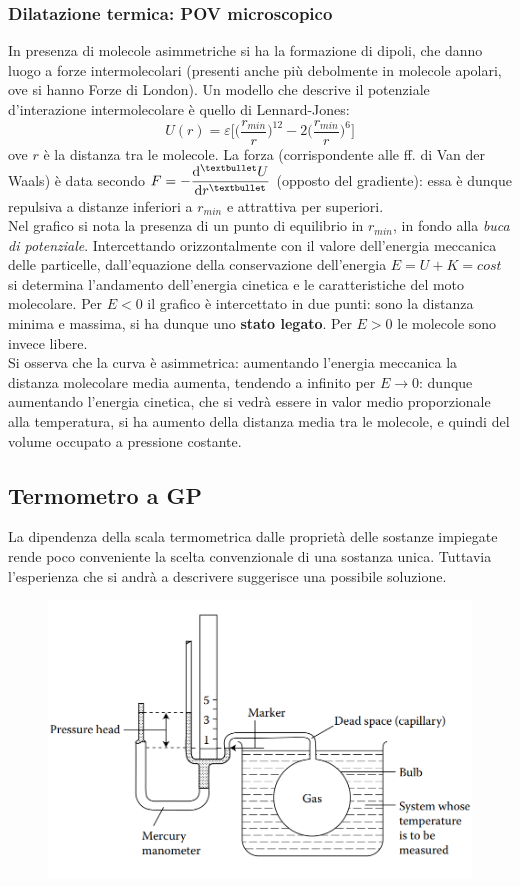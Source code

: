 \documentclass[10pt, oneside]{book}
\begin{document}
\subsubsection*{Dilatazione termica: POV microscopico}
In presenza di molecole asimmetriche si ha la formazione di dipoli, che danno luogo a forze intermolecolari (presenti anche più debolmente in molecole apolari, ove si hanno Forze di London). Un modello che descrive il potenziale d'interazione intermolecolare è quello di Lennard-Jones:
\[U(r) = \varepsilon \bigg[\bigg(\frac{r_{min}}{r}\bigg)^{12} - 2 \bigg(\frac{r_{min}}{r}\bigg)^6\bigg]\]
ove $r$ è la distanza tra le molecole. La forza (corrispondente alle ff. di Van der Waals) è data secondo $\displaystyle F = - \dv[•]{U}{r}$ (opposto del gradiente): essa è dunque repulsiva a distanze inferiori a $r_{min}$ e attrattiva per superiori.
\\Nel grafico si nota la presenza di un punto di equilibrio in $r_{min}$, in fondo alla \textit{buca di potenziale}. Intercettando orizzontalmente con il valore dell'energia meccanica delle particelle, dall'equazione della conservazione dell'energia $E = U + K = cost$ si determina l'andamento dell'energia cinetica e le caratteristiche del moto molecolare. Per $E < 0$ il grafico è intercettato in due punti: sono la distanza minima e massima, si ha dunque uno \textbf{stato legato}. Per $E > 0$ le molecole sono invece libere.
\\Si osserva che la curva è asimmetrica: aumentando l'energia meccanica la distanza molecolare media aumenta, tendendo a infinito per $E \rightarrow 0$: dunque aumentando l'energia cinetica, che si vedrà essere in valor medio proporzionale alla temperatura, si ha aumento della distanza media tra le molecole, e quindi del volume occupato a pressione costante.

\subsection{Termometro a GP}
La dipendenza della scala termometrica dalle proprietà delle sostanze impiegate rende poco conveniente la scelta convenzionale di una sostanza unica. Tuttavia l'esperienza che si andrà a descrivere suggerisce una possibile soluzione.

\begin{figure}
\centering
\includegraphics[scale=0.6]{Termometro_gp.png}
\end{figure}
\end{document}
